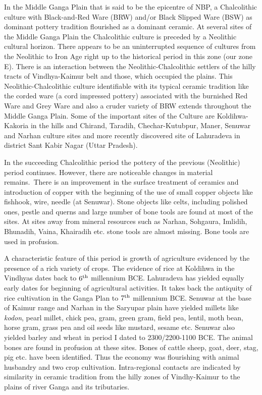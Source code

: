 In the Middle Ganga Plain that is said to be the epicentre of NBP, a Chalcolithic culture with Black-and-Red Ware (BRW) and/or Black Slipped Ware (BSW) as dominant pottery tradition flourished as a dominant ceramic. At several sites of the Middle Ganga Plain the Chalcolithic culture is preceded by a Neolithic cultural horizon. There appears to be an uninterrupted sequence of cultures from the Neolithic to Iron Age right up to the historical period in this zone (our zone E). There is an interaction between the Neolithic-Chalcolithic settlers of the hilly tracts of Vindhya-Kaimur belt and those, which occupied the plains. This Neolithic-Chalcolithic culture identifiable with its typical ceramic tradition like the corded ware (a cord impressed pottery) associated with the burnished Red Ware and Grey Ware and also a cruder variety of BRW extends throughout the Middle Ganga Plain. Some of the important sites of the Culture are Koldihwa-Kakoria in the hills and Chirand, Taradih, Chechar-Kutubpur, Maner, Senuwar and Narhan culture sites and more recently discovered site of Lahuradeva in district Sant Kabir Nagar (Uttar Pradesh). 

In the succeeding Chalcolithic period the pottery of the previous (Neolithic) period continues. However, there are noticeable changes in material remains.~There is an improvement in the surface treatment of ceramics and introduction of copper with the beginning of the use of small copper objects like fishhook, wire, needle (at Senuwar). Stone objects like celts, including polished ones, pestle and querns and large number of bone tools are found at most of the sites. At sites away from mineral resources such as Narhan, Sohgaura, Imlidih, Bhunadih, Vaina, Khairadih etc. stone tools are almost missing. Bone tools are used in profusion.

A characteristic feature of this period is growth of agriculture evidenced by the presence of a rich variety of crops. The evidence of rice at Koldihwa in the Vindhyas dates back to $6^{\rm th}$ millennium BCE. Lahuradeva has yielded equally early dates for beginning of agricultural activities. It takes back the antiquity of rice cultivation in the Ganga Plan to $7^{\rm th}$ millennium BCE. Senuwar at the base of Kaimur range and Narhan in the Saryupar plain have yielded millets like \textit{kodon}, pearl millet, chick pea, gram, green gram, field pea, lentil, moth bean, horse gram, grass pea and oil seeds like mustard, sesame etc. Senuwar also yielded barley and wheat in period I dated to 2300/2200-1100 BCE. The animal bones are found in profusion at these sites. Bones of cattle sheep, goat, deer, stag, pig etc. have been identified. Thus the economy was flourishing with animal husbandry and two crop cultivation. Intra-regional contacts are indicated by similarity in ceramic tradition from the hilly zones of Vindhy-Kaimur to the plains of river Ganga and its tributaries.

